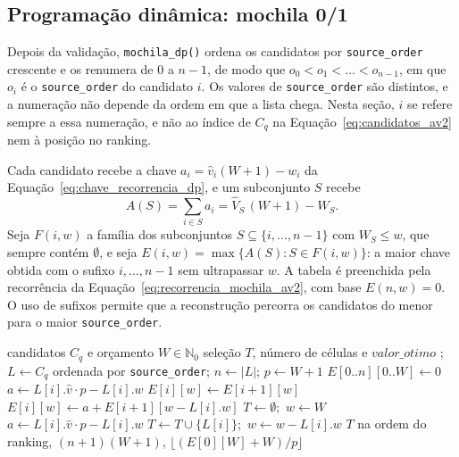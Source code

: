 \documentclass[11pt,a4paper]{article}
\theoremstyle{plain}
\theoremstyle{definition}
\theoremstyle{plain}
\begin{document}
\subsection{Programação dinâmica: mochila 0/1}
\label{sec:dp}

Depois da validação, \texttt{mochila\_dp()} ordena os candidatos por
\texttt{source\_order} crescente e os renumera de $0$ a $n-1$, de modo que
$o_0<o_1<\dots<o_{n-1}$, em que $o_i$ é o \texttt{source\_order} do candidato $i$. Os
valores de \texttt{source\_order} são distintos, e a numeração não depende da ordem em
que a lista chega. Nesta seção, $i$ se refere sempre a essa numeração, e não ao índice de
$C_q$ na Equação~\eqref{eq:candidatos_av2} nem à posição no ranking.

Cada candidato recebe a chave $a_i=\hat{v}_i(W+1)-w_i$ da
Equação~\eqref{eq:chave_recorrencia_dp}, e um subconjunto $S$ recebe
\[
  A(S)=\sum_{i\in S}a_i=\hat{V}_S\,(W+1)-W_S .
\]
Seja $F(i,w)$ a família dos subconjuntos $S\subseteq\{i,\dots,n-1\}$ com $W_S\le w$, que
sempre contém $\emptyset$, e seja $E(i,w)=\max\{A(S):S\in F(i,w)\}$: a maior chave obtida
com o sufixo $i,\dots,n-1$ sem ultrapassar $w$. A tabela é preenchida pela recorrência da
Equação~\eqref{eq:recorrencia_mochila_av2}, com base $E(n,w)=0$. O uso de sufixos permite
que a reconstrução percorra os candidatos do menor para o maior \texttt{source\_order}.

\begin{algorithm}[htbp]
\caption{Mochila 0/1 com os desempates da especificação (\texttt{mochila\_dp})}
\label{alg:dp}
\begin{algorithmic}[1]
\Require candidatos $C_q$ e orçamento $W\in\mathbb{N}_0$
\Ensure seleção $T$, número de células e $\mathit{valor\_otimo}$
  \State {}; $L\gets C_q$ ordenada por \texttt{source\_order}; $n\gets|L|$; $p\gets W+1$
  \State $E[0..n][0..W]\gets 0$ 
    \State $a\gets L[i].\hat{v}\cdot p-L[i].w$
      \State $E[i][w]\gets E[i+1][w]$ \label{lin:sem}
      \label{lin:compara}
        \State $E[i][w]\gets a+E[i+1][w-L[i].w]$ \label{lin:com}
      \EndIf
    \EndFor
  \EndFor
  \State $T\gets\emptyset$;\ $w\gets W$\label{lin:rec-ini}
   
    \State $a\gets L[i].\hat{v}\cdot p-L[i].w$
    \label{lin:leva}
      \State $T\gets T\cup\{L[i]\}$;\ $w\gets w-L[i].w$\label{lin:rec-fim}
    \EndIf
  \EndFor
  \State \Return $T$ na ordem do ranking, $(n+1)(W+1)$, $\lfloor (E[0][W]+W)/p\rfloor$\label{lin:retorno}
\EndFunction
\end{algorithmic}
\end{algorithm}
\end{document}
